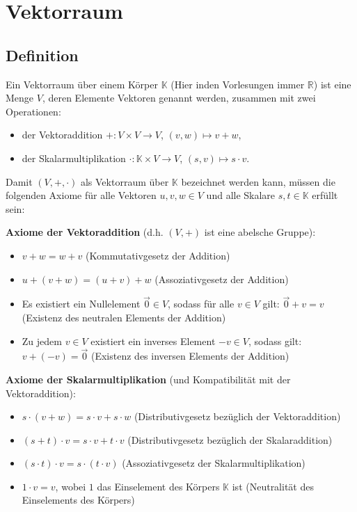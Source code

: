 \chapter{Vektorraum}

\section{Definition}

Ein Vektorraum über einem Körper $\mathbb{K}$ (Hier inden Vorlesungen immer $\mathbb{R}$) ist eine Menge $V$, deren Elemente Vektoren genannt werden, zusammen mit zwei Operationen:
\begin{itemize}
    \item der Vektoraddition $+ : V \times V \to V$, $(v, w) \mapsto v+w$,
    \item der Skalarmultiplikation $\cdot : \mathbb{K} \times V \to V$, $(s, v) \mapsto s \cdot v$.
\end{itemize}

Damit $(V, +, \cdot)$ als Vektorraum über $\mathbb{K}$ bezeichnet werden kann, müssen die folgenden Axiome für alle Vektoren $u, v, w \in V$ und alle Skalare $s, t \in \mathbb{K}$ erfüllt sein:

\textbf{Axiome der Vektoraddition} (d.h. $(V,+)$ ist eine abelsche Gruppe):
\begin{itemize}
    \item $v + w = w + v$ (Kommutativgesetz der Addition)
    \item $u + (v + w) = (u + v) + w$ (Assoziativgesetz der Addition)
    \item Es existiert ein Nullelement $\vec{0} \in V$, sodass für alle $v \in V$ gilt: $\vec{0} + v = v$ (Existenz des neutralen Elements der Addition)
    \item Zu jedem $v \in V$ existiert ein inverses Element $-v \in V$, sodass gilt: $v + (-v) = \vec{0}$ (Existenz des inversen Elements der Addition)
\end{itemize}

\textbf{Axiome der Skalarmultiplikation} (und Kompatibilität mit der Vektoraddition):
\begin{itemize}
    \item $s \cdot (v + w) = s \cdot v + s \cdot w$ (Distributivgesetz bezüglich der Vektoraddition)
    \item $(s + t) \cdot v = s \cdot v + t \cdot v$ (Distributivgesetz bezüglich der Skalaraddition)
    \item $(s \cdot t) \cdot v = s \cdot (t \cdot v)$ (Assoziativgesetz der Skalarmultiplikation)
    \item $1 \cdot v = v$, wobei $1$ das Einselement des Körpers $\mathbb{K}$ ist (Neutralität des Einselements des Körpers)
\end{itemize}


